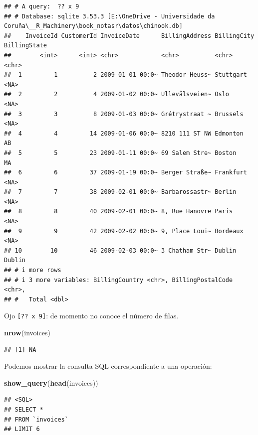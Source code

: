 \documentclass[
]{book}
\newenvironment{Shaded}{\begin{snugshade}}{\end{snugshade}}
\newcommand{\FunctionTok}[1]{\textcolor[rgb]{0.13,0.29,0.53}{\textbf{#1}}}
\newcommand{\NormalTok}[1]{#1}
\theoremstyle{break}
\theoremstyle{nonumberplain}
\begin{document}
\begin{verbatim}
## # A query:  ?? x 9
## # Database: sqlite 3.53.3 [E:\OneDrive - Universidade da Coruña\__R_Machinery\book_notasr\datos\chinook.db]
##    InvoiceId CustomerId InvoiceDate      BillingAddress BillingCity BillingState
##        <int>      <int> <chr>            <chr>          <chr>       <chr>       
##  1         1          2 2009-01-01 00:0~ Theodor-Heuss~ Stuttgart   <NA>        
##  2         2          4 2009-01-02 00:0~ Ullevålsveien~ Oslo        <NA>        
##  3         3          8 2009-01-03 00:0~ Grétrystraat ~ Brussels    <NA>        
##  4         4         14 2009-01-06 00:0~ 8210 111 ST NW Edmonton    AB          
##  5         5         23 2009-01-11 00:0~ 69 Salem Stre~ Boston      MA          
##  6         6         37 2009-01-19 00:0~ Berger Straße~ Frankfurt   <NA>        
##  7         7         38 2009-02-01 00:0~ Barbarossastr~ Berlin      <NA>        
##  8         8         40 2009-02-01 00:0~ 8, Rue Hanovre Paris       <NA>        
##  9         9         42 2009-02-02 00:0~ 9, Place Loui~ Bordeaux    <NA>        
## 10        10         46 2009-02-03 00:0~ 3 Chatham Str~ Dublin      Dublin      
## # i more rows
## # i 3 more variables: BillingCountry <chr>, BillingPostalCode <chr>,
## #   Total <dbl>
\end{verbatim}

Ojo \texttt{{[}??\ x\ 9{]}}: de momento no conoce el número de filas.

\begin{Shaded}
\begin{Highlighting}[]
\FunctionTok{nrow}\NormalTok{(invoices)}
\end{Highlighting}
\end{Shaded}

\begin{verbatim}
## [1] NA
\end{verbatim}

Podemos mostrar la consulta SQL correspondiente a una operación:

\begin{Shaded}
\begin{Highlighting}[]
\FunctionTok{show\_query}\NormalTok{(}\FunctionTok{head}\NormalTok{(invoices))}
\end{Highlighting}
\end{Shaded}

\begin{verbatim}
## <SQL>
## SELECT *
## FROM `invoices`
## LIMIT 6
\end{verbatim}
\end{document}
